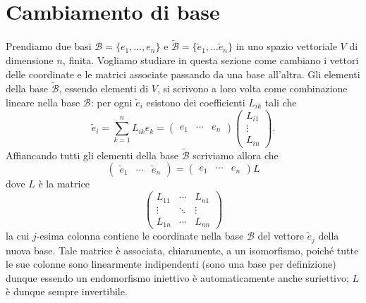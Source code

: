 \section{Cambiamento di base}
\label{sec:cambiamento-base}
Prendiamo due basi $\mathcal B=\{e_1,\dots,e_n\}$ e $\tilde{\mathcal B}=\{\tilde e_1,\dots\tilde e_n\}$ in uno spazio vettoriale $V$ di dimensione $n$, finita.
Vogliamo studiare in questa sezione come cambiano i vettori delle coordinate e le matrici associate passando da una base all'altra.
Gli elementi della base $\tilde{\mathcal B}$, essendo elementi di $V$, si scrivono a loro volta come combinazione lineare nella base $\mathcal B$: per ogni $\tilde e_i$ esistono dei coefficienti $L_{ik}$ tali che
\begin{equation}
	\tilde e_i=\sum_{k=1}^nL_{ik}e_k=
	\begin{pmatrix}
		e_1&\cdots&e_n
	\end{pmatrix}
	\begin{pmatrix}
		L_{i1}\\
		\vdots\\
		L_{in}
	\end{pmatrix}.
\end{equation}
Affiancando tutti gli elementi della base $\tilde{\mathcal B}$ scriviamo allora che
\begin{equation}
	\begin{pmatrix}
		\tilde e_1&\cdots&\tilde e_n
	\end{pmatrix}
	=
	\begin{pmatrix}
		e_1&\cdots&e_n
	\end{pmatrix}
	L
	\label{eq:trasformazione-base}
\end{equation}
dove $L$ è la matrice
\begin{equation}
	\begin{pmatrix}
		L_{11}&\cdots&L_{n1}\\
		\vdots&\ddots&\vdots\\
		L_{1n}&\cdots&L_{nn}
	\end{pmatrix}
\end{equation}
la cui $j$-esima colonna contiene le coordinate nella base $\mathcal B$ del vettore $\tilde e_j$ della nuova base.
Tale matrice è associata, chiaramente, a un isomorfismo, poich\'e tutte le sue colonne sono linearmente indipendenti (sono una base per definizione) dunque essendo un endomorfismo iniettivo è automaticamente anche suriettivo; $L$ è dunque sempre invertibile.

